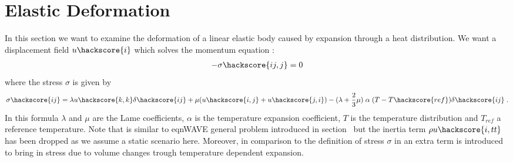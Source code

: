%
%
%
%
%
%

\section{Elastic Deformation}
\label{ELASTIC CHAP}
In this section we want to examine the deformation of a linear elastic body caused by expansion through a heat distribution. We want 
a displacement field $u\hackscore{i}$ which solves the momentum equation
:
\begin{eqnarray}\label{HEATEDBLOCK general problem}
 - \sigma\hackscore{ij,j}=0
\end{eqnarray}
where the stress $\sigma$ is given by
\begin{eqnarray}\label{HEATEDBLOCK linear elastic}
 \sigma\hackscore{ij}= \lambda u\hackscore{k,k} \delta\hackscore{ij} + \mu ( u\hackscore{i,j} + u\hackscore{j,i})
 - (\lambda+\frac{2}{3} \mu)  \; \alpha  \;  (T-T\hackscore{ref})\delta\hackscore{ij} \;.
\end{eqnarray}
In this formula $\lambda$ and $\mu$ are the Lame coefficients, $\alpha$ is the 
temperature expansion coefficient, $T$ is the temperature distribution and $T_{ref}$ a reference temperature. Note that 
 is similar to eqn{WAVE general problem} introduced in section~ but the
inertia term $\rho u\hackscore{i,tt}$ has been dropped as we assume a static scenario here. Moreover, in 
comparison to the 
definition of stress $\sigma$ in  an extra term is introduced 
to bring in stress due to volume changes trough temperature dependent expansion.   

